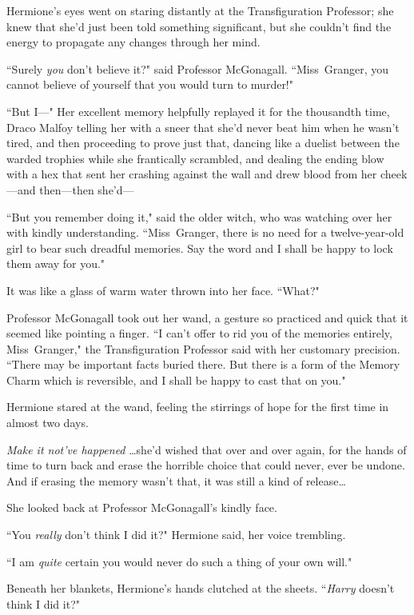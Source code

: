 Hermione's eyes went on staring distantly at the Transfiguration Professor; she knew that she'd just been told something significant, but she couldn't find the energy to propagate any changes through her mind.

``Surely \emph{you} don't believe it?" said Professor McGonagall. ``Miss~Granger, you cannot believe of yourself that you would turn to murder!"

``But I—" Her excellent memory helpfully replayed it for the thousandth time, Draco Malfoy telling her with a sneer that she'd never beat him when he wasn't tired, and then proceeding to prove just that, dancing like a duelist between the warded trophies while she frantically scrambled, and dealing the ending blow with a hex that sent her crashing against the wall and drew blood from her cheek—and then—then she'd—

``But you remember doing it," said the older witch, who was watching over her with kindly understanding. ``Miss~Granger, there is no need for a twelve-year-old girl to bear such dreadful memories. Say the word and I shall be happy to lock them away for you."

It was like a glass of warm water thrown into her face. ``What?"

Professor McGonagall took out her wand, a gesture so practiced and quick that it seemed like pointing a finger. ``I can't offer to rid you of the memories entirely, Miss~Granger," the Transfiguration Professor said with her customary precision. ``There may be important facts buried there. But there is a form of the Memory Charm which is reversible, and I shall be happy to cast that on you."

Hermione stared at the wand, feeling the stirrings of hope for the first time in almost two days.

\emph{Make it not've happened} {\ldots}she'd wished that over and over again, for the hands of time to turn back and erase the horrible choice that could never, ever be undone. And if erasing the memory wasn't that, it was still a kind of release{\ldots}

She looked back at Professor McGonagall's kindly face.

``You \emph{really} don't think I did it?" Hermione said, her voice trembling.

``I am \emph{quite} certain you would never do such a thing of your own will."

Beneath her blankets, Hermione's hands clutched at the sheets. ``\emph{Harry} doesn't think I did it?"


